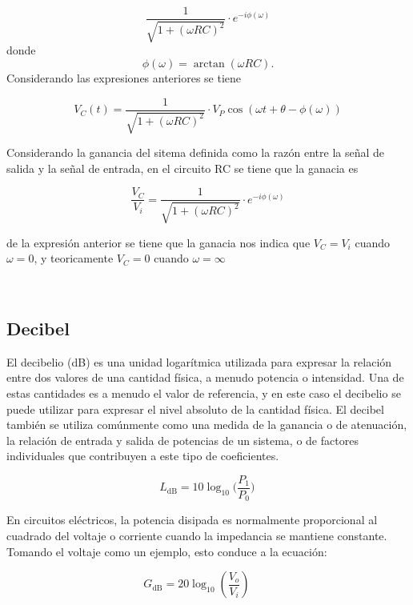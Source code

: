 \documentclass{article}
\begin{document}
\[
\frac{1}{\sqrt{1 + (\omega RC)^2}}\cdot e^{-i \phi(\omega)}
\] donde \[
\phi(\omega) = \arctan(\omega RC).
\] Considerando las expresiones anteriores se tiene

\begin{equation}
V_C(t) = \frac{1}{\sqrt{1 + (\omega RC)^2}}\cdot V_P \cos(\omega t + \theta- \phi(\omega)) 
\end{equation}

Considerando la ganancia del sitema definida como la razón entre la
señal de salida y la señal de entrada, en el circuito RC se tiene que la
ganacia es

\begin{equation}
\frac{V_{C}}{V_{i}}=\frac{1}{\sqrt{1 + (\omega RC)^2}}\cdot e^{-i \phi(\omega)}
\end{equation}

de la expresión anterior se tiene que la ganacia nos indica que
$V_C=V_i$ cuando $\omega=0$, y teoricamente $V_C=0$ cuando
$\omega=\infty$


    \begin{center}
    \end{center}
    { \hspace*{\fill} \\}
    

    \subsection{Decibel}


    El decibelio (dB) es una unidad logarítmica utilizada para expresar la
relación entre dos valores de una cantidad física, a menudo potencia o
intensidad. Una de estas cantidades es a menudo el valor de referencia,
y en este caso el decibelio se puede utilizar para expresar el nivel
absoluto de la cantidad física. El decibel también se utiliza comúnmente
como una medida de la ganancia o de atenuación, la relación de entrada y
salida de potencias de un sistema, o de factores individuales que
contribuyen a este tipo de coeficientes.

\[
L_\mathrm{dB} = 10 \log_{10} \bigg(\frac{P_1}{P_0}\bigg) \,
\]

En circuitos eléctricos, la potencia disipada es normalmente
proporcional al cuadrado del voltaje o corriente cuando la impedancia se
mantiene constante. Tomando el voltaje como un ejemplo, esto conduce a
la ecuación:

\[
G_\mathrm{dB} =20 \log_{10} \left (\frac{V_o}{V_i} \right ) \quad \mathrm \quad
\]
\end{document}
